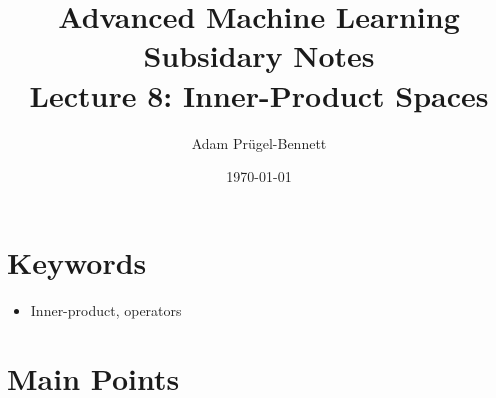 \documentclass[11pt]{article}
\author{Adam Prügel-Bennett}
\date{\today}
\title{Advanced Machine Learning Subsidary Notes\\\medskip
\large Lecture 8: Inner-Product Spaces}
\begin{document}
\maketitle



\section{Keywords}
\label{sec:org2616c29}
\begin{itemize}
\item Inner-product, operators
\end{itemize}

\section{Main Points}
\label{sec:org3fd61a3}
\end{document}
